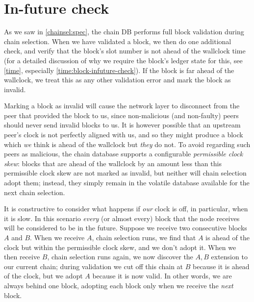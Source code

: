 %
%
%
%
%
%

\section{In-future check}
\label{chainsel:infuture}

As we saw in \cref{chainsel:spec}, the chain DB performs full
block validation during chain selection. When we have validated a block, we then
do one additional check, and verify that the block's slot number is not ahead of
the wallclock time (for a detailed discussion of why we require the block's
ledger state for this, see \cref{time}, especially
\cref{time:block-infuture-check}). If the block is far ahead of the wallclock,
we treat this as any other validation error and mark the block as invalid.

Marking a block as invalid will cause the network layer to disconnect from the
peer that provided the block to us, since non-malicious (and non-faulty) peers
should never send invalid blocks to us. It is however possible that an upstream
peer's clock is not perfectly aligned with us, and so they might produce a block
which \emph{we} think is ahead of the wallclock but \emph{they} do not. To avoid
regarding such peers as malicious, the chain database supports a configurable
\emph{permissible clock skew}: blocks that are ahead of the wallclock by an
amount less than this permissible clock skew are not marked as invalid, but
neither will chain selection adopt them; instead, they simply remain in the
volatile database available for the next chain selection.

It is constructive to consider what happens if \emph{our} clock is off, in
particular, when it is slow. In this scenario \emph{every} (or almost every)
block that the node receives will be considered to be in the future. Suppose we
receive two consecutive blocks $A$ and $B$. When we receive $A$, chain selection
runs, we find that $A$ is ahead of the clock but within the permissible clock
skew, and we don't adopt it. When we then receive $B$, chain selection runs
again, we now discover the $A, B$ extension to our current chain; during
validation we cut off this chain at $B$ because it is ahead of the clock, but we
adopt $A$ because it is now valid.  In other words, we are always behind one
block, adopting each block only when we receive the \emph{next} block.

